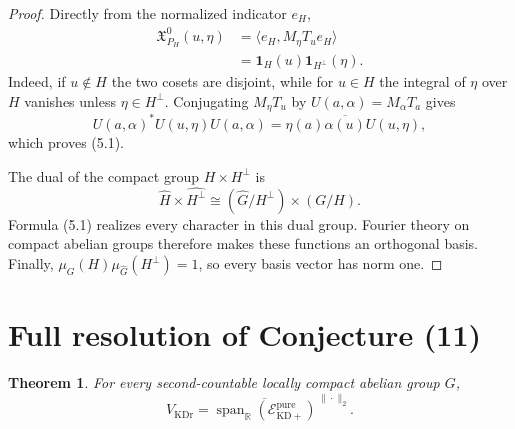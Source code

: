 \documentclass[11pt]{article}
\newtheorem{theorem}{Theorem}
\theoremstyle{remark}
\newcommand{\Ghat}{\widehat G}
\newcommand{\Epp}{\mathcal E_{\mathrm{KD}+}^{\mathrm{pure}}}
\newcommand{\VKD}{V_{\mathrm{KDr}}}
\newcommand{\X}{\mathfrak X}
\newcommand{\one}{\mathbf 1}
\begin{document}
\begin{proof}
Directly from the normalized indicator $e_H$,
\begin{align*}
 \X^0_{P_H}(u,\eta)
 &=\langle e_H,M_\eta T_u e_H\rangle\\
 &=\one_H(u)\one_{H^\perp}(\eta).                            \tag{5.2}
\end{align*}
Indeed, if $u\notin H$ the two cosets are disjoint, while for $u\in H$ the
integral of $\eta$ over $H$ vanishes unless $\eta\in H^\perp$.  Conjugating
$M_\eta T_u$ by $U(a,\alpha)=M_\alpha T_a$ gives
\[
 U(a,\alpha)^*U(u,\eta)U(a,\alpha)
 =\eta(a)\overline{\alpha(u)}U(u,\eta),
\]
which proves (5.1).

The dual of the compact group $H\times H^\perp$ is
\[
 \widehat H\times\widehat{H^\perp}
 \cong (\Ghat/H^\perp)\times(G/H).
\]
Formula (5.1) realizes every character in this dual group.  Fourier theory
on compact abelian groups therefore makes these functions an orthogonal
basis.  Finally,
$\mu_G(H)\mu_{\Ghat}(H^\perp)=1$, so every basis vector has norm one.
\end{proof}

\section{Full resolution of Conjecture (11)}

\begin{theorem}\label{thm:main}
For every second-countable locally compact abelian group $G$,
\[
 \boxed{\displaystyle
 \VKD=\overline{\operatorname{span}_{\mathbb R}(\Epp)}^{\,\|\cdot\|_2}.}
\]
\end{theorem}
\end{document}
